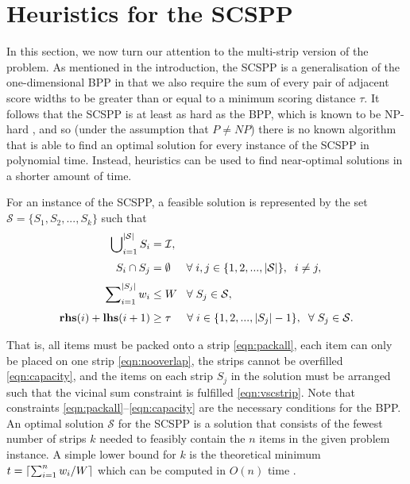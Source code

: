 \documentclass[runningheads]{llncs}
\begin{document}
\section{Heuristics for the SCSPP}
\label{sec:scsppsoln}

In this section, we now turn our attention to the multi-strip version of the problem. As mentioned in the introduction, the SCSPP is a generalisation of the one-dimensional BPP in that we also require the sum of every pair of adjacent score widths to be greater than or equal to a minimum scoring distance $\tau$. It follows that the SCSPP is at least as hard as the BPP, which is known to be NP-hard \cite{garey1979}, and so (under the assumption that $P \neq NP$) there is no known algorithm that is able to find an optimal solution for every instance of the SCSPP in polynomial time. Instead, heuristics can be used to find near-optimal solutions in a shorter amount of time.

For an instance of the SCSPP, a feasible solution is represented by the set $\mathcal{S} = \{S_1, S_2, ..., S_k\}$ such that
\begin{subequations}
	\begin{align}
		\bigcup\nolimits_{i=1}^{|\mathcal{S}|} S_i &= \mathcal{I}, \label{eqn:packall}\\[3pt]
		S_i \cap S_j &= \emptyset \hspace{5mm} \forall \hspace{1mm} i, j \in \{1, 2, ..., |\mathcal{S}|\}, \hspace{2mm} i \neq j, \label{eqn:nooverlap} \\[3pt]
		\sum\nolimits_{i=1}^{|S_j|}w_i & \leq W \hspace{3mm} \forall \hspace{1mm} S_j \in \mathcal{S}, \label{eqn:capacity} \\[3pt]
		\textup{\textbf{rhs}}(i) + \textup{\textbf{lhs}}(i+1) &\geq \tau \hspace {5mm} \forall \hspace{1mm} i \in \{1, 2, ..., |S_j|-1\}, \hspace{2mm} \forall \hspace{1mm} S_j \in \mathcal{S}. \label{eqn:vscstrip}
\end{align}
\end{subequations}

\noindent That is, all items must be packed onto a strip \eqref{eqn:packall}, each item can only be placed on one strip \eqref{eqn:nooverlap}, the strips cannot be overfilled \eqref{eqn:capacity}, and the items on each strip $S_j$ in the solution must be arranged such that the vicinal sum constraint is fulfilled \eqref{eqn:vscstrip}. Note that constraints \eqref{eqn:packall}--\eqref{eqn:capacity} are the necessary conditions for the BPP. An optimal solution $\mathcal{S}$ for the SCSPP is a solution that consists of the fewest number of strips $k$ needed to feasibly contain the $n$ items in the given problem instance. A simple lower bound for $k$ is the theoretical minimum
$t = \ceil*{\sum_{i=1}^{n}w_i / W}$ which can be computed in $O(n)$ time \cite{martello1990b}. 
\end{document}
